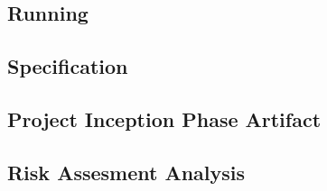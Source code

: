 \subsection{Running \thename{}}
\label{sec:appendix:make}

\subsection{\thename{} Specification}
\label{sec:appendix:spec}


\subsection{Project Inception Phase Artifact}
\label{appendix:inception-artifact}


\subsection{Risk Assesment Analysis}
\label{appendix:risk-assessment}

